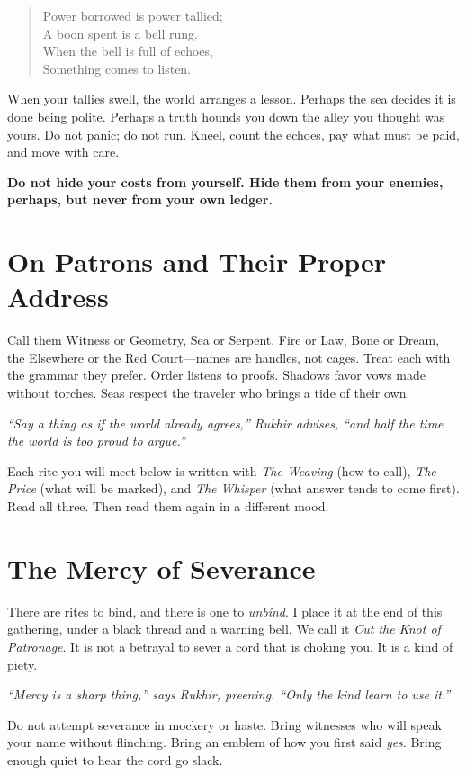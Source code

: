 \documentclass[12pt,twoside]{book}
\newcommand{\shadow}[1]{\textit{#1}}
\newcommand{\whisper}[1]{\textbf{#1}}
\begin{document}
	\begin{verse}
	Power borrowed is power tallied; \\
	A boon spent is a bell rung. \\
	When the bell is full of echoes, \\
	Something comes to listen.
	\end{verse}

	When your tallies swell, the world arranges a lesson. Perhaps the sea decides it is done being polite. Perhaps a truth hounds you down the alley you thought was yours. Do not panic; do not run. Kneel, count the echoes, pay what must be paid, and move with care.

	\whisper{Do not hide your costs from yourself. Hide them from your enemies, perhaps, but never from your own ledger.}

	\section*{On Patrons and Their Proper Address}
	Call them Witness or Geometry, Sea or Serpent, Fire or Law, Bone or Dream, the Elsewhere or the Red Court—names are handles, not cages. Treat each with the grammar they prefer. Order listens to proofs. Shadows favor vows made without torches. Seas respect the traveler who brings a tide of their own.

	\shadow{``Say a thing as if the world already agrees,'' Rukhir advises, ``and half the time the world is too proud to argue.''}

	Each rite you will meet below is written with \emph{The Weaving} (how to call), \emph{The Price} (what will be marked), and \emph{The Whisper} (what answer tends to come first). Read all three. Then read them again in a different mood.

	\section*{The Mercy of Severance}
There are rites to bind, and there is one to \emph{unbind}. I place it at the end of this gathering, under a black thread and a warning bell. We call it \emph{Cut the Knot of Patronage}. It is not a betrayal to sever a cord that is choking you. It is a kind of piety.

\shadow{``Mercy is a sharp thing,'' says Rukhir, preening. ``Only the kind learn to use it.''}

Do not attempt severance in mockery or haste. Bring witnesses who will speak your name without flinching. Bring an emblem of how you first said \emph{yes}. Bring enough quiet to hear the cord go slack.
\end{document}
